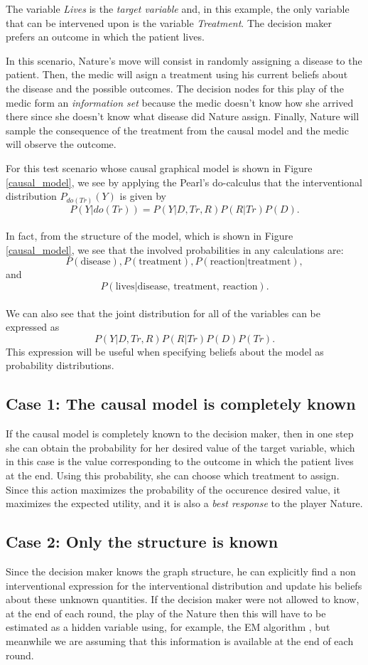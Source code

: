 \documentclass[english,letterpaper,12pt,final]{article}
\theoremstyle{definition}
\begin{document}
The variable \textit{Lives} is the \textit{target variable} and, in this example, the only variable that can be intervened upon is the variable \textit{Treatment}. The decision maker prefers an outcome in which the patient lives.

In this scenario, Nature's move will consist in randomly assigning a disease to the patient. Then, the medic will asign a treatment using his current beliefs about the disease and the possible outcomes. The decision nodes for this play of the medic form an \textit{information set} because the medic doesn't know how she arrived there since she doesn't know what disease did Nature assign. Finally, Nature will sample the consequence of the treatment from the causal model and the medic will observe the outcome.

For this test scenario whose causal graphical model is shown in Figure \ref{causal_model}, we see  by applying the Pearl's do-calculus that the interventional distribution $P_{do(Tr)}(Y)$ is given by
\[ P(Y | do(Tr))=P(Y | D, Tr, R)P(R | Tr) P(D). \]
\\
In fact, from the structure of the model, which is shown in Figure \ref{causal_model}, we see that the involved probabilities in any calculations are:
\[ P(\textrm{disease}), P(\textrm{treatment}), P(\textrm{reaction} | \textrm{treatment}), \]
and
\[P(\textrm{lives} | \textrm{disease, treatment, reaction}). \]
\\
We can also see that the joint distribution for all of the variables can be expressed as
\[ P(Y | D, Tr, R)P(R | Tr) P(D)P(Tr). \]
This expression will be useful when specifying beliefs about the model as probability distributions.

\subsection{Case 1: The causal model is completely known}
If the causal model is completely known to the decision maker, then in one step she can obtain the probability for her desired value of the target variable, which in this case is the value corresponding to the outcome in which the patient lives at the end. Using this probability, she can choose which treatment to assign. Since this action maximizes the probability of the occurence desired value, it maximizes the expected utility, and it is also a \textit{best response} to the player Nature.

\subsection{Case 2: Only the structure is known}
Since the decision maker knows the graph structure, he can explicitly find a non interventional expression for the interventional distribution and update his beliefs about these unknown quantities. If the decision maker were not allowed to know, at the end of each round, the play of the Nature then this will have to be estimated as a hidden variable using, for example, the EM algorithm \cite{dempster1977maximum}, but meanwhile we are assuming that this information is available at the end of each round.
\end{document}
